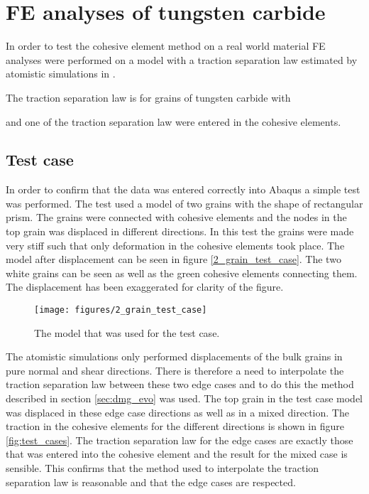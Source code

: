 \documentclass[wcco.tex]{subfiles}
\begin{document}
\FloatBarrier


\section{FE analyses of tungsten carbide}

In order to test the cohesive element method on a real world material FE analyses were performed on a model with a traction separation law estimated by atomistic simulations in \cite{Gren2013}. 

The traction separation law is for grains of tungsten carbide with 

 and one of the traction separation law were entered in the cohesive elements.
 
\subsection{Test case} 
  In order to confirm that the data was entered correctly into Abaqus a simple test was performed. The test used a model of two grains with the shape of rectangular prism. The grains were connected with cohesive elements and the nodes in the top grain was displaced in different directions. In this test the grains were made very stiff such that only deformation in the cohesive elements took place. The model after displacement can be seen in figure \ref{2_grain_test_case}. The two white grains can be seen as well as the green cohesive elements connecting them. The displacement has been exaggerated for clarity of the figure.

\begin{figure}[ht]
\centering
\texttt{[image: figures/2\_grain\_test\_case]}
\caption{The model that was used for the test case.}
\label{fig:2_grain_test_case}
\end{figure}

The atomistic simulations only performed displacements of the bulk grains in pure normal and shear directions. There is therefore a need to interpolate the traction separation law between these two edge cases and to do this the method described in section \ref{sec:dmg_evo} was used. The top grain in the test case model was displaced in these edge case directions as well as in a mixed direction. The traction in the cohesive elements for the different directions is shown in figure \ref{fig:test_cases}. The traction separation law for the edge cases are exactly those that was entered into the cohesive element and the result for the mixed case is sensible. This confirms that the method used to interpolate the traction separation law is reasonable and that the edge cases are respected.
\end{document}
